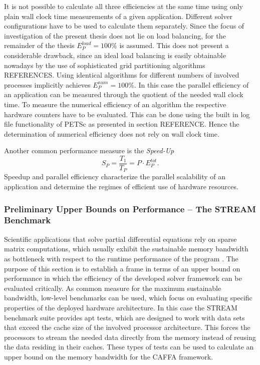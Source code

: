 It is not possible to calculate all three efficiencies at the same time using only plain wall clock time measurements of a given application.  Different solver configurations have to be used to calculate them separately. Since the focus of investigation of the present thesis does not lie on load balancing, for the remainder of the thesis \(E^{load}_P = 100\%  \) is assumed. This does not present a considerable drawback, since an ideal load balancing is easily obtainable nowadays by the use of sophisticated grid partitioning algorithms \cite{loadbalancing} REFERENCES. Using identical algorithms for different numbers of involved processes implicitly achieves \(E^{num}_P = 100 \%\). In this case the parallel efficiency of an application can be measured through the quotient of the needed wall clock time. To measure the numerical efficiency of an algorithm the respective hardware counters have to be evaluated. This can be done using the built in log file functionality of PETSc as presented in section REFERENCE. Hence the determination of numerical efficiency does not rely on wall clock time.

Another common performance measure is the \emph{Speed-Up}
\begin{displaymath}
  S_P = \frac{T_1}{T_P} = P \cdot E^{tot}_P.
\end{displaymath}
Speedup and parallel efficiency characterize the parallel scalability of an application and determine the regimes of efficient use of hardware resources.

\subsubsection{Preliminary Upper Bounds on Performance -- The STREAM Benchmark}

Scientific applications that solve partial differential equations rely on sparse matrix computations, which usually exhibit the sustainable memory bandwidth as bottleneck with respect to the runtime performance of the program \cite{hager11}. The purpose of this section is to establish a frame in terms of an upper bound on performance in which the efficiency of the developed solver framework can be evaluated critically. As common measure for the maximum sustainable bandwidth, low-level benchmarks can be used, which focus on evaluating specific properties of the deployed hardware architecture. In this case the STREAM benchmark suite \cite{mccalpin07,mccalpin95} provides apt tests, which are designed to work with data sets that exceed the cache size of the involved processor architecture. This forces the processors to stream the needed data directly from the memory instead of reusing the data residing in their caches. These types of tests can be used to calculate an upper bound on the memory bandwidth for the CAFFA framework.

